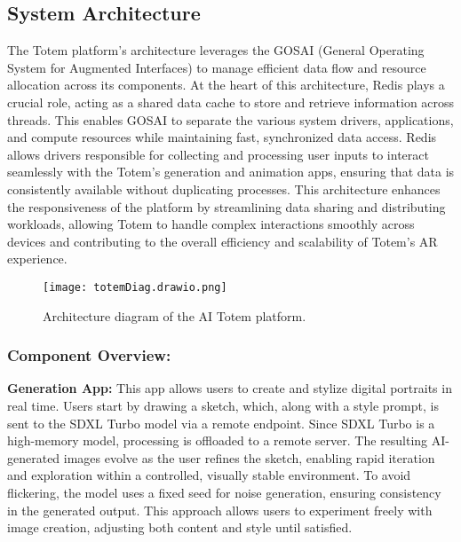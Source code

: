 \subsection{System Architecture}

The Totem platform's architecture leverages the GOSAI (General Operating System for Augmented Interfaces) to manage efficient data flow and resource allocation across its components.
At the heart of this architecture, Redis plays a crucial role, acting as a shared data cache to store and retrieve information across threads.
This enables GOSAI to separate the various system drivers, applications, and compute resources while maintaining fast, synchronized data access.
Redis allows drivers responsible for collecting and processing user inputs to interact seamlessly with the Totem’s generation and animation apps, ensuring that data is consistently available without duplicating processes.
This architecture enhances the responsiveness of the platform by streamlining data sharing and distributing workloads, allowing Totem to handle complex interactions smoothly across devices and contributing to the overall efficiency and scalability of Totem’s AR experience.

\begin{figure}[h!]
    \centering
    \texttt{[image: totemDiag.drawio.png]}
    \caption{Architecture diagram of the AI Totem platform.}
    \vspace{0.1cm}
    \label{fig:diagtotem}
\end{figure}

\subsubsection{ Component Overview:}

\textbf{Generation App:} This app allows users to create and stylize digital portraits in real time.
Users start by drawing a sketch, which, along with a style prompt, is sent to the SDXL Turbo model via a remote endpoint.
Since SDXL Turbo is a high-memory model, processing is offloaded to a remote server.
The resulting AI-generated images evolve as the user refines the sketch, enabling rapid iteration and exploration within a controlled, visually stable environment.
To avoid flickering, the model uses a fixed seed for noise generation, ensuring consistency in the generated output.
This approach allows users to experiment freely with image creation, adjusting both content and style until satisfied.

